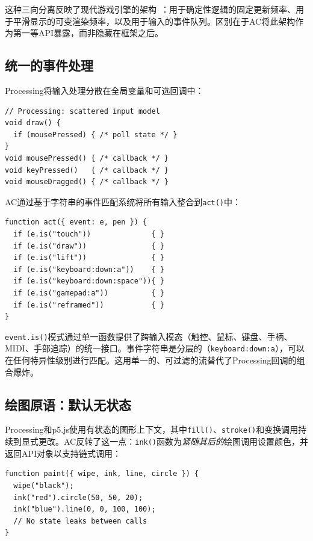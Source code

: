 \documentclass[10pt,letterpaper,twocolumn]{article}
\begin{document}
这种三向分离反映了现代游戏引擎的架构~\citep{nystrom2014game}：用于确定性逻辑的固定更新频率、用于平滑显示的可变渲染频率，以及用于输入的事件队列。区别在于AC将此架构作为第一等API暴露，而非隐藏在框架之后。

\subsection{统一的事件处理}

Processing将输入处理分散在全局变量和可选回调中：

\begin{lstlisting}[style=processingstyle]
// Processing: scattered input model
void draw() {
  if (mousePressed) { /* poll state */ }
}
void mousePressed() { /* callback */ }
void keyPressed()   { /* callback */ }
void mouseDragged() { /* callback */ }
\end{lstlisting}

AC通过基于字符串的事件匹配系统将所有输入整合到\texttt{act()}中：

\begin{lstlisting}[style=acjsstyle]
function act({ event: e, pen }) {
  if (e.is("touch"))              { }
  if (e.is("draw"))               { }
  if (e.is("lift"))               { }
  if (e.is("keyboard:down:a"))    { }
  if (e.is("keyboard:down:space")){ }
  if (e.is("gamepad:a"))          { }
  if (e.is("reframed"))           { }
}
\end{lstlisting}

\texttt{event.is()}模式通过单一函数提供了跨输入模态（触控、鼠标、键盘、手柄、MIDI、手部追踪）的统一接口。事件字符串是分层的（\texttt{keyboard:down:a}），可以在任何特异性级别进行匹配。这用单一的、可过滤的流替代了Processing回调的组合爆炸。

\subsection{绘图原语：默认无状态}

Processing和p5.js使用有状态的图形上下文，其中\texttt{fill()}、\texttt{stroke()}和变换调用持续到显式更改。AC反转了这一点：\texttt{ink()}函数为\emph{紧随其后的}绘图调用设置颜色，并返回API对象以支持链式调用：

\begin{lstlisting}[style=acjsstyle]
function paint({ wipe, ink, line, circle }) {
  wipe("black");
  ink("red").circle(50, 50, 20);
  ink("blue").line(0, 0, 100, 100);
  // No state leaks between calls
}
\end{lstlisting}
\end{document}
